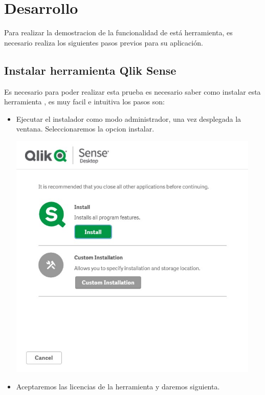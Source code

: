  \section{Desarrollo} 

Para realizar la demostracion de la funcionalidad de está herramienta,  es necesario realiza los siguientes pasos previos para su aplicación.
\subsection{Instalar herramienta Qlik Sense}

Es necesario para poder realizar esta prueba es necesario saber como instalar esta herramienta , es muy facil e intuitiva los pasos son: 

\begin{itemize}
		\item Ejecutar el instalador como modo administrador, una vez desplegada la ventana. Seleccionaremos la opcion instalar.
\begin{center}
	\includegraphics[width=12cm]{./Imagenes/img1} 
\end{center}
		\item Aceptaremos las licencias de la herramienta y daremos siguienta.
\begin{center}

\end{center}
\end{itemize}
